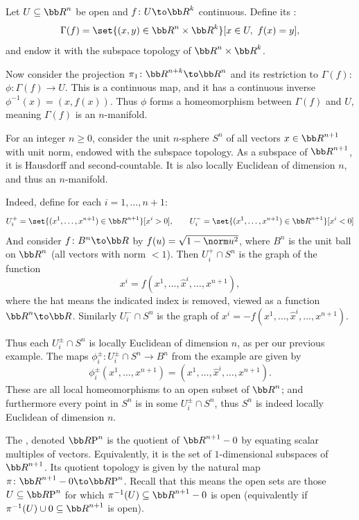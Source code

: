 \edefn

\bexam

    Let $U\subseteq\bR^n$ be open and $f\colon U\to\bR^k$ continuous.
    Define its :
    $$ \Gamma(f) = \set{(x,y)\in\bR^n\times\bR^k}[x\in U,\ f(x)=y], $$
    and endow it with the subspace topology of $\bR^n\times\bR^k$.

    Now consider the projection $\pi_1\colon\bR^{n+k}\to\bR^n$ and its restriction to $\Gamma(f)$: $\phi\colon\Gamma(f)\to U$.
    This is a continuous map, and it has a continuous inverse $\phi^{-1}(x)=(x,f(x))$.
    Thus $\phi$ forms a homeomorphism between $\Gamma(f)$ and $U$, meaning $\Gamma(f)$ is an $n$-manifold.

\eexam

\bexam

    For an integer $n\geq0$, consider the unit $n$-sphere $S^n$ of all vectors $x\in\bR^{n+1}$ with unit norm, endowed with the subspace topology.
    As a subspace of $\bR^{n+1}$, it is Hausdorff and second-countable.
    It is also locally Euclidean of dimension $n$, and thus an $n$-manifold.

    Indeed, define for each $i=1,\dots,n+1$:
    $$ U_i^+ = \set{(x^1,\dots,x^{n+1})\in\bR^{n+1}}[x^i>0],\qquad U_i^- = \set{(x^1,\dots,x^{n+1})\in\bR^{n+1}}[x^i<0] $$
    And consider $f\colon B^n\to\bR$ by $f(u)=\sqrt{1-\norm u^2}$, where $B^n$ is the unit ball on $\bR^n$ (all vectors with norm $<1$).
    Then $U_i^+\cap S^n$ is the graph of the function
    $$ x^i = f(x^1,\dots,\hat x^i,\dots,x^{n+1}), $$
    where the hat means the indicated index is removed, viewed as a function $\bR^n\to\bR$.
    Similarly $U_i^-\cap S^n$ is the graph of $x^i=-f(x^1,\dots,\hat x^i,\dots,x^{n+1})$.

    Thus each $U_i^\pm\cap S^n$ is locally Euclidean of dimension $n$, as per our previous example.
    The maps $\phi_i^\pm\colon U_i^\pm\cap S^n\to B^n$ from the example are given by
    $$ \phi_i^\pm(x^1,\dots,x^{n+1}) = (x^1,\dots,\hat x^i,\dots,x^{n+1}) . $$
    These are all local homeomorphisms to an open subset of $\bR^n$; and furthermore every point in $S^n$ is in some $U_i^\pm\cap S^n$, thus $S^n$ is indeed locally Euclidean
    of dimension $n$.

\eexam

\bexam

    The , denoted $\RP^n$ is the quotient of $\bR^{n+1}-0$ by equating scalar multiples of vectors.
    Equivalently, it is the set of $1$-dimensional subspaces of $\bR^{n+1}$.
    Its quotient topology is given by the natural map $\pi\colon\bR^{n+1}-0\to\RP^n$.
    Recall that this means the open sets are those $U\subseteq\RP^n$ for which $\pi^{-1}(U)\subseteq\bR^{n+1}-0$ is open (equivalently if $\pi^{-1}(U)\cup0\subseteq\bR^{n+1}$ is open).

